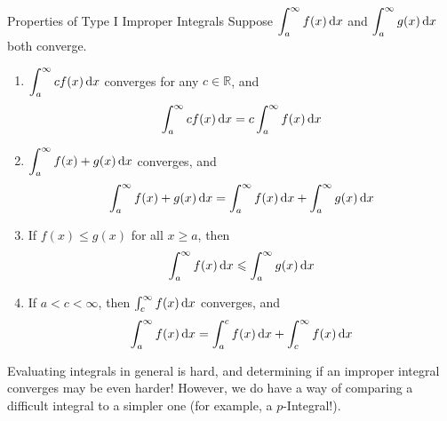 \begin{Theorem}{Properties of Type I Improper Integrals}{}
    Suppose $ \displaystyle \int_{a}^{\infty} f(x)\odif{x}  $ and
    $ \displaystyle \int_{a}^{\infty} g(x)\odif{x}  $
    both converge.
    \begin{enumerate}[label=(\arabic*)]
        \item $ \displaystyle \int_{a}^{\infty} cf(x)\odif{x} $
            converges for any $ c\in\mathbb{R} $, and
            \[ \int_{a}^{\infty} cf(x)\odif{x} =c \int_{a}^{\infty} f(x)\odif{x} \]
        \item $ \displaystyle \int_{a}^{\infty} f(x)+g(x)\odif{x} $
            converges, and
            \[ \int_{a}^{\infty} f(x)+g(x)\odif{x}=
            \int_{a}^{\infty} f(x)\odif{x} +\int_{a}^{\infty} g(x)\odif{x} \]
        \item If $ f(x)\leqslant g(x) $ for all $ x\geqslant a $, then
            \[ \int_{a}^{\infty} f(x)\odif{x} \leqslant \int_{a}^{\infty} g(x)\odif{x} \]
        \item If $ a<c<\infty $, then $ \int_{c}^{\infty} f(x)\odif{x} $ converges, and
            \[ \int_{a}^{\infty} f(x)\odif{x}=
            \int_{a}^{c} f(x)\odif{x} +\int_{c}^{\infty} f(x)\odif{x} \]
    \end{enumerate}
\end{Theorem}
Evaluating integrals in general is hard, and determining if an improper integral converges
may be even harder! However, we do have a way of comparing a difficult
integral to a simpler one (for example, a $ p $-Integral!).

